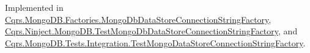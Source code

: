 Implemented in \hyperlink{classCqrs_1_1MongoDB_1_1Factories_1_1MongoDbDataStoreConnectionStringFactory_ab8729212ac8fe8350dead56fc89a5fd2}{Cqrs.\+Mongo\+D\+B.\+Factories.\+Mongo\+Db\+Data\+Store\+Connection\+String\+Factory}, \hyperlink{classCqrs_1_1Ninject_1_1MongoDB_1_1TestMongoDbDataStoreConnectionStringFactory_a9ef0515d08d9a309fcfef00b15dad8cf}{Cqrs.\+Ninject.\+Mongo\+D\+B.\+Test\+Mongo\+Db\+Data\+Store\+Connection\+String\+Factory}, and \hyperlink{classCqrs_1_1MongoDB_1_1Tests_1_1Integration_1_1TestMongoDataStoreConnectionStringFactory_a1f362a8cdae3f0fb7b8a51f62f7611f3}{Cqrs.\+Mongo\+D\+B.\+Tests.\+Integration.\+Test\+Mongo\+Data\+Store\+Connection\+String\+Factory}.

